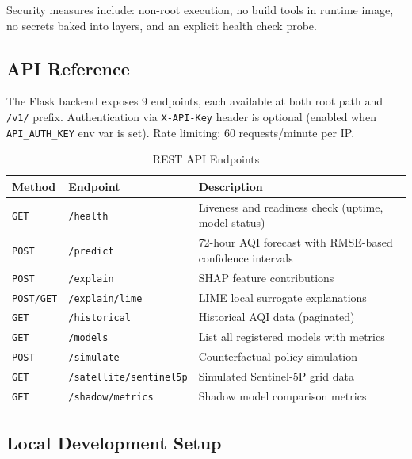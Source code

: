\documentclass[12pt, a4paper, oneside]{article}
\begin{document}
Security measures include: non-root execution, no build tools in runtime image, no secrets baked into layers, and an explicit health check probe.

\subsection{API Reference}

The Flask backend exposes 9 endpoints, each available at both root path and \texttt{/v1/} prefix. Authentication via \texttt{X-API-Key} header is optional (enabled when \texttt{API\_AUTH\_KEY} env var is set). Rate limiting: 60 requests/minute per IP.

\begin{table}[H]
\centering
\caption{REST API Endpoints}
\label{tab:api}
\begin{tabularx}{\textwidth}{l l X}
\toprule
\textbf{Method} & \textbf{Endpoint} & \textbf{Description} \\
\midrule
\texttt{GET} & \texttt{/health} & Liveness and readiness check (uptime, model status) \\
\texttt{POST} & \texttt{/predict} & 72-hour AQI forecast with RMSE-based confidence intervals \\
\texttt{POST} & \texttt{/explain} & SHAP feature contributions \\
\texttt{POST/GET} & \texttt{/explain/lime} & LIME local surrogate explanations \\
\texttt{GET} & \texttt{/historical} & Historical AQI data (paginated) \\
\texttt{GET} & \texttt{/models} & List all registered models with metrics \\
\texttt{POST} & \texttt{/simulate} & Counterfactual policy simulation \\
\texttt{GET} & \texttt{/satellite/sentinel5p} & Simulated Sentinel-5P grid data \\
\texttt{GET} & \texttt{/shadow/metrics} & Shadow model comparison metrics \\
\bottomrule
\end{tabularx}
\end{table}

\subsection{Local Development Setup}
\end{document}
